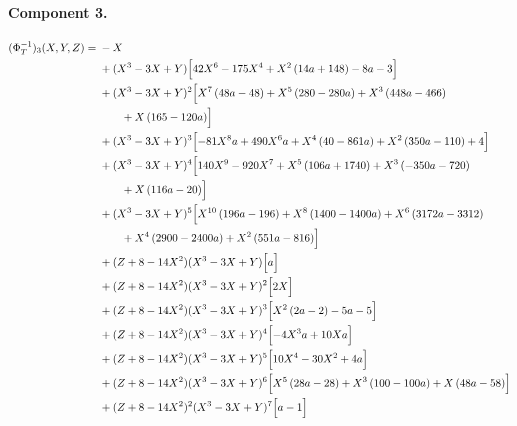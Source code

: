 \paragraph{Component 3.}
\begingroup
\footnotesize
\allowdisplaybreaks[0]
\begin{align*}
(\Phi_T^{-1})_3(X,Y,Z)={}&- X\\
&{}+(X^3-3X+Y)\Bigl[42 X^{6} - 175 X^{4} + X^{2} \left(14 a + 148\right) - 8 a - 3\Bigr]\\
&{}+(X^3-3X+Y)^{2}\Bigl[X^{7} \left(48 a - 48\right) + X^{5} \left(280 - 280 a\right) + X^{3} \left(448 a - 466\right)\\
&\qquad + X \left(165 - 120 a\right)\Bigr]\\
&{}+(X^3-3X+Y)^{3}\Bigl[- 81 X^{8} a + 490 X^{6} a + X^{4} \left(40 - 861 a\right) + X^{2} \left(350 a - 110\right) + 4\Bigr]\\
&{}+(X^3-3X+Y)^{4}\Bigl[140 X^{9} - 920 X^{7} + X^{5} \left(106 a + 1740\right) + X^{3} \left(- 350 a - 720\right)\\
&\qquad + X \left(116 a - 20\right)\Bigr]\\
&{}+(X^3-3X+Y)^{5}\Bigl[X^{10} \left(196 a - 196\right) + X^{8} \left(1400 - 1400 a\right) + X^{6} \left(3172 a - 3312\right)\\
&\qquad + X^{4} \left(2900 - 2400 a\right) + X^{2} \left(551 a - 816\right)\Bigr]\\
&{}+(Z+8-14X^2)(X^3-3X+Y)\Bigl[a\Bigr]\\
&{}+(Z+8-14X^2)(X^3-3X+Y)^{2}\Bigl[2 X\Bigr]\\
&{}+(Z+8-14X^2)(X^3-3X+Y)^{3}\Bigl[X^{2} \left(2 a - 2\right) - 5 a - 5\Bigr]\\
&{}+(Z+8-14X^2)(X^3-3X+Y)^{4}\Bigl[- 4 X^{3} a + 10 X a\Bigr]\\
&{}+(Z+8-14X^2)(X^3-3X+Y)^{5}\Bigl[10 X^{4} - 30 X^{2} + 4 a\Bigr]\\
&{}+(Z+8-14X^2)(X^3-3X+Y)^{6}\Bigl[X^{5} \left(28 a - 28\right) + X^{3} \left(100 - 100 a\right) + X \left(48 a - 58\right)\Bigr]\\
&{}+(Z+8-14X^2)^{2}(X^3-3X+Y)^{7}\Bigl[a - 1\Bigr]
\end{align*}
\endgroup

